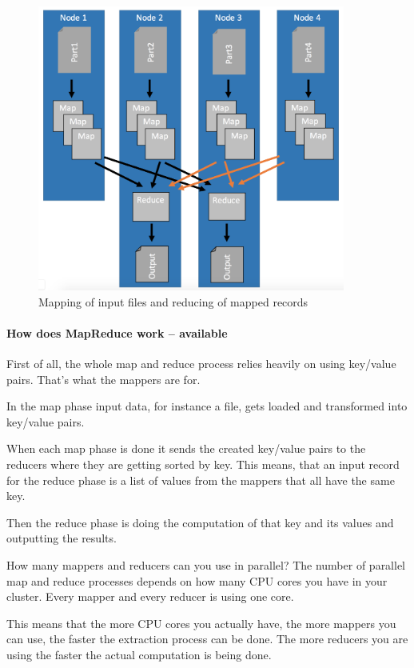 \documentclass[12pt]{scrartcl} %
\begin{document}
\begin{figure}[htbp]
  \centering
     \includegraphics[width=0.9\textwidth]{images/MapReduce-Process-Detailed}
  \caption{Mapping of input files and reducing of mapped records}
  \label{fig:Bild1}
\end{figure}

\paragraph{How does MapReduce work -- available}

First of all, the whole map and reduce process relies heavily on using key/value pairs. That’s what the mappers are for.

In the map phase input data, for instance a file, gets loaded and transformed into key/value pairs.

When each map phase is done it sends the created key/value pairs to the reducers where they are getting sorted by key. This means, that an input record for the reduce phase is a list of values from the mappers that all have the same key.

Then the reduce phase is doing the computation of that key and its values and outputting the results.

How many mappers and reducers can you use in parallel? The number of parallel map and reduce processes depends on how many CPU cores you have in your cluster. Every mapper and every reducer is using one core.

This means that the more CPU cores you actually have, the more mappers you can use, the faster the extraction process can be done. The more reducers you are using the faster the actual computation is being done.
\end{document}
